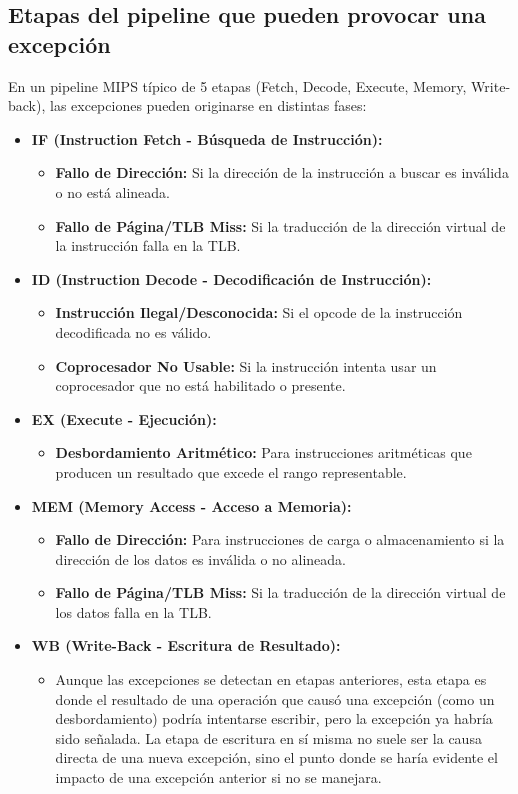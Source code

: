\documentclass[12pt,a4paper]{article}
\begin{document}
	\subsection{Etapas del pipeline que pueden provocar una excepción}
	En un pipeline MIPS típico de 5 etapas (Fetch, Decode, Execute, Memory, Write-back), las excepciones pueden originarse en distintas fases:
	\begin{itemize}
		\item \textbf{IF (Instruction Fetch - Búsqueda de Instrucción):}
		\begin{itemize}
			\item \textbf{Fallo de Dirección:} Si la dirección de la instrucción a buscar es inválida o no está alineada.
			\item \textbf{Fallo de Página/TLB Miss:} Si la traducción de la dirección virtual de la instrucción falla en la TLB.
		\end{itemize}
		\item \textbf{ID (Instruction Decode - Decodificación de Instrucción):}
		\begin{itemize}
			\item \textbf{Instrucción Ilegal/Desconocida:} Si el opcode de la instrucción decodificada no es válido.
			\item \textbf{Coprocesador No Usable:} Si la instrucción intenta usar un coprocesador que no está habilitado o presente.
		\end{itemize}
		\item \textbf{EX (Execute - Ejecución):}
		\begin{itemize}
			\item \textbf{Desbordamiento Aritmético:} Para instrucciones aritméticas que producen un resultado que excede el rango representable.
		\end{itemize}
		\item \textbf{MEM (Memory Access - Acceso a Memoria):}
		\begin{itemize}
			\item \textbf{Fallo de Dirección:} Para instrucciones de carga o almacenamiento si la dirección de los datos es inválida o no alineada.
			\item \textbf{Fallo de Página/TLB Miss:} Si la traducción de la dirección virtual de los datos falla en la TLB.
		\end{itemize}
		\item \textbf{WB (Write-Back - Escritura de Resultado):}
		\begin{itemize}
			\item Aunque las excepciones se detectan en etapas anteriores, esta etapa es donde el resultado de una operación que causó una excepción (como un desbordamiento) podría intentarse escribir, pero la excepción ya habría sido señalada. La etapa de escritura en sí misma no suele ser la causa directa de una nueva excepción, sino el punto donde se haría evidente el impacto de una excepción anterior si no se manejara.
		\end{itemize}
	\end{itemize}
	
\end{document}
